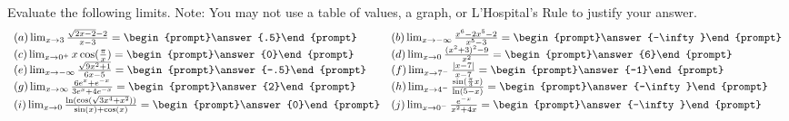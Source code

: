 \documentclass{ximera}
\begin{document}
\begin{exercise}
  Evaluate the following limits. Note: You may not use a table of values, a graph,
  or L'Hospital's Rule to justify your answer.
\[
\begin{array}{l l}
  (a) \lim_{x\to 3} \frac{\sqrt{2x-2}-2}{x-3}=\begin{prompt}\answer{.5}\end{prompt}
	&
  (b) \lim_{x\to -\infty} \frac{x^6-2x^5-2}{x^5-3}=\begin{prompt}\answer{-\infty}\end{prompt} \\
  (c) \lim_{x\to 0^+} x\cos(\frac{\pi}{x})=\begin{prompt}\answer{0}\end{prompt} &
  (d) \lim_{x\to 0} \frac{(x^2+3)^2-9}{x^2}=\begin{prompt}\answer{6}\end{prompt}\\
  (e) \lim_{x\to -\infty} \frac{\sqrt{9x^2+1}}{6x-5}=\begin{prompt}\answer{-.5}\end{prompt} &
  (f) \lim_{x\to 7^-} \frac{|x-7|}{x-7}=\begin{prompt}\answer{-1}\end{prompt}\\
  (g) \lim_{x\to \infty} \frac{6e^x+e^{-x}}{3e^x+4e^{-x}}=\begin{prompt}\answer{2}\end{prompt}&
  (h) \lim_{x\to 4^-} \frac{\sin(\frac{\pi}{3}x)}{\ln(5-x)}=\begin{prompt}\answer{-\infty}\end{prompt}\\
  (i) \lim_{x\to 0} \frac{\ln(\cos(\sqrt{3x^4+x^2}))}{\sin(x)+\cos(x)}=\begin{prompt}\answer{0}\end{prompt}
&
  (j) \lim_{x\to 0^-} \frac{e^{-x}}{x^2+4x}=\begin{prompt}\answer{-\infty}\end{prompt}
\end{array}
\]
\end{exercise}
\end{document}
